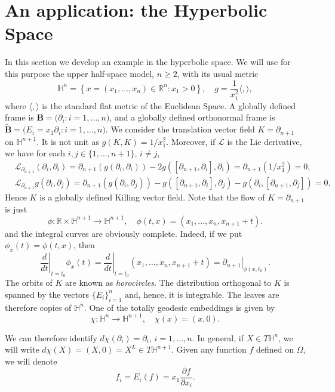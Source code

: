 \documentclass[12pt]{article}
\numberwithin{lemma}{section}
\newcommand{\R}{\mathbb{R}}
\renewcommand{\L}{\mathcal{L}}
\renewcommand{\H}[1]{\mathbb{H}^{#1}}
\newcommand{\BB}{\mathbf{B}}
\begin{document}
{\section{An application: the Hyperbolic Space}\label{An application: the Hyperbolic Space}
In this section we develop an example in the hyperbolic space. %
We will use for this purpose the upper half-space model, $n\geq 2$, with its usual metric 
\[\H{n}=\left\{ x=(x_1,\ldots,x_n)\in\R^n : x_1>0\right\}, \quad g=\frac{1}{x_1^2}\langle,\rangle,
\]
where $\langle,\rangle$ is the standard flat metric of the Euclidean Space. A globally defined frame is $\BB=\big(\partial_i : i=1,\ldots,n\big)$, and a globally defined orthonormal frame is $\tilde{\BB} = \big( E_i=x_1\partial_i : i=1,\ldots,n\big)$. 
We consider the translation vector field $K=\partial_{n+1}$ on $\H{n+1}$. It is not unit as $g(K,K)=1/x_1^2$. Moreover, if $\mathcal{L}$ is the Lie derivative, we have for each $i,j\in\{1,\ldots,n+1\}$, $i\neq j$, 
\begin{align*}
&\L_{\partial_{n+1}}(\partial_i,\partial_i) = \partial_{n+1}(g(\partial_i,\partial_i)) - 2g([\partial_{n+1},\partial_i],\partial_i) = \partial_{n+1}( 1/x_1^2 ) =0, \\
&\L_{\partial_{n+1}}g(\partial_i,\partial_j) = \partial_{n+1}(g(\partial_i,\partial_j)) - g([\partial_{n+1},\partial_i],\partial_j) 
-g(\partial_i,[\partial_{n+1},\partial_j])=0.
\end{align*}
Hence $K$ is a globally defined Killing vector field. 
Note that the flow of $K=\partial_{n+1}$ is just
\[ \phi : \R\times \H{n+1}\rightarrow \H{n+1}, \quad \phi(t,x)=(x_1,\ldots,x_n,x_{n+1}+t).
\]
and the integral curves are obviously complete.
Indeed, if we put $\phi_x(t)=\phi(t,x)$, then
\[ \left.\frac{d}{dt}\right\vert_{t=t_0} \phi_x(t) =  
\left.\frac{d}{dt}\right\vert_{t=t_0} (x_1,\ldots,x_n,x_{n+1}+t) = 
\left. \partial_{n+1} \right\vert_{\phi(x,t_0)}.
\]
The orbits of $K$ are known as \textit{horocircles}. The distribution orthogonal to $K$ is spanned by the vectors $\{ E_i\}_{i=1}^n$ and, hence, it is integrable. The leaves are therefore copies of $\mathbb{H}^n$. One of the totally geodesic embeddings is given by
\[ \chi : \H{n} \rightarrow \H{n+1}, \quad \chi(x)=(x,0).
\]

We can therefore identify $d\chi(\partial_i) =\partial_i$, $i=1,\ldots,n$. In general, if $X\in T\H{n}$, we will write $d\chi(X)=(X,0)=X^L\in T\H{n+1}$. Given any function $f$ defined on $\Omega$, we will denote 
\[ f_i = E_i(f) =x_1\frac{\partial f}{\partial x_i}.\]

}
\end{document}
